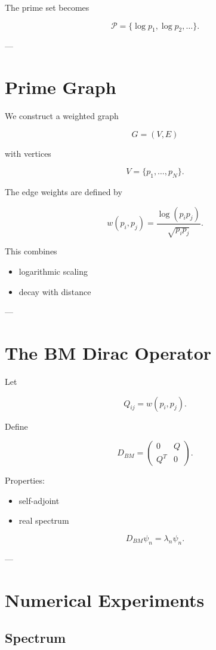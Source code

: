 \documentclass[11pt,a4paper]{article}
\begin{document}
	The prime set becomes
	
	\[
	\mathcal P=\{\log p_1,\log p_2,\dots\}.
	\]
	
	---
	
	\section{Prime Graph}
	
	We construct a weighted graph
	
	\[
	G=(V,E)
	\]
	
	with vertices
	
	\[
	V=\{p_1,\dots,p_N\}.
	\]
	
	The edge weights are defined by
	
	\[
	w(p_i,p_j)=
	\frac{\log(p_i p_j)}{\sqrt{p_i p_j}}.
	\]
	
	This combines
	
	\begin{itemize}
		\item logarithmic scaling
		\item decay with distance
	\end{itemize}
	
	---
	
	\section{The BM Dirac Operator}
	
	Let
	
	\[
	Q_{ij}=w(p_i,p_j).
	\]
	
	Define
	
	\[
	D_{BM}=
	\begin{pmatrix}
		0 & Q\\
		Q^T & 0
	\end{pmatrix}.
	\]
	
	Properties:
	
	\begin{itemize}
		\item self-adjoint
		\item real spectrum
	\end{itemize}
	
	\[
	D_{BM}\psi_n=\lambda_n\psi_n.
	\]
	
	---
	
	\section{Numerical Experiments}
	
	\subsection{Spectrum}
	
\end{document}
